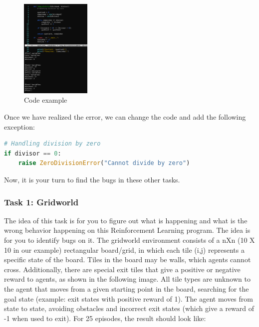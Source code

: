 \begin{figure}[h]
    \centering
    \includegraphics[width=0.3\textwidth]{figures/code_changes.png}
    \caption{Code example}
    \label{fig:code-example}
\end{figure}

Once we have realized the error, we can change the code and add the following exception:

\begin{lstlisting}[language=Python]
# Handling division by zero
if divisor == 0:
    raise ZeroDivisionError("Cannot divide by zero")
\end{lstlisting}

Now, it is your turn to find the bugs in these other tasks.

\subsubsection{Task 1: Gridworld}

The idea of this task is for you to figure out what is happening and what is the wrong behavior happening on this Reinforcement Learning program. The idea is for you to identify bugs on it. The gridworld environment consists of a nXn (10 X 10 in our example) rectangular board/grid, in which each tile (i,j) represents a specific state of the board. Tiles in the board may be walls, which agents cannot cross. Additionally, there are special exit tiles that give a positive or negative reward to agents, as shown in the following image. All tile types are unknown to the agent that moves from a given starting point in the board, searching for the goal state (example: exit states with positive reward of 1). The agent moves from state to state, avoiding obstacles and incorrect exit states (which give a reward of -1 when used to exit). For 25 episodes, the result should look like:

